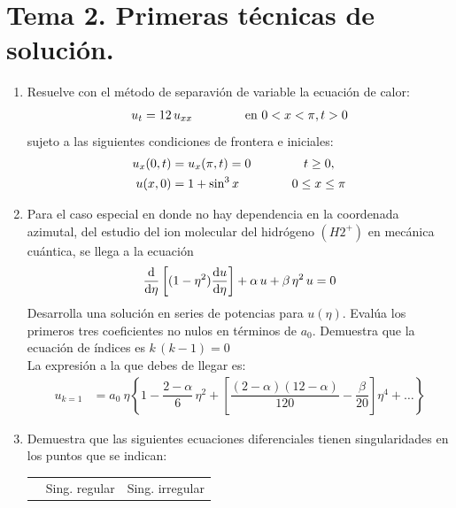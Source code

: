 \documentclass[hidelinks,12pt]{article}
\begin{document}
\section{Tema 2. Primeras técnicas de solución.}

\begin{enumerate}
    \item Resuelve con el método de separavión de variable la ecuación de calor:
        \begin{align*}
            u_{t} = 12 \, u_{xx} \hspace{1.5cm} \text{en } 0 < x < \pi, t > 0
        \end{align*}
        sujeto a las siguientes condiciones de frontera e iniciales:
        \begin{align*}
            u_{x} (0, t) &= u_{x} (\pi, t) = 0 \hspace{1.5cm} t \geq 0, \\
            u (x, 0) &= 1 + \sin^{3} x \hspace{1.5cm} 0 \leq x \leq \pi
        \end{align*}
    \item Para el caso especial en donde no hay dependencia en la coordenada azimutal, del estudio del ion molecular del hidrógeno $(H2^{+})$ en mecánica cuántica, se llega a la ecuación
        \begin{align*}
            \dv{\eta} \left[ (1 - \eta^{2} ) \dv{u}{\eta} \right] + \alpha \, u + \beta \, \eta^{2} \, u = 0
        \end{align*}
        Desarrolla una solución en series de potencias para $u(\eta)$. Evalúa los primeros tres coeficientes no nulos en términos de $a_{0}$. Demuestra que la ecuación de índices es $k \, (k - 1) = 0$
        \\
        La expresión a la que debes de llegar es:
        \begin{align*}
            u_{k=1} &=  a_{0} \: \eta \left\lbrace 1 - \dfrac{2- \alpha}{6} \, \eta^{2} + \left[ \dfrac{(2-\alpha)(12-\alpha)}{120} - \dfrac{\beta}{20} \right] \eta^{4} + \ldots \right\rbrace
        \end{align*}
    \item Demuestra que las siguientes ecuaciones diferenciales tienen singularidades en los puntos que se indican:
        \begin{table}[H]
            \centering
            \begin{tabular}{l c c}
                & Sing. regular & Sing. irregular \\

\end{tabular}
\end{table}
\end{enumerate}
\end{document}
